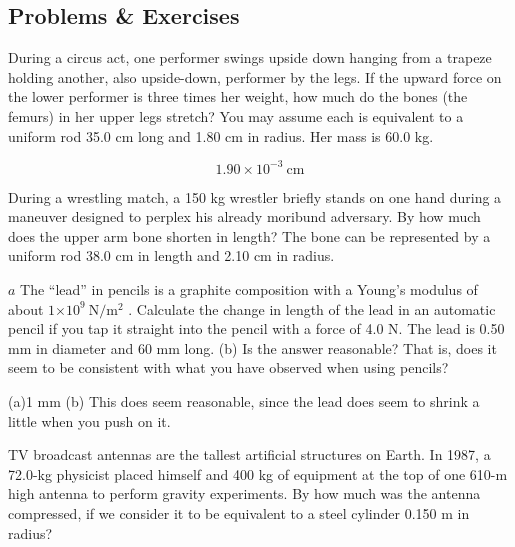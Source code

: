 \documentclass[
]{book}
\begin{document}
\hypertarget{fs-id1165298820012}{}
\hypertarget{problems-exercises-11}{%
\subsection{Problems \& Exercises}\label{problems-exercises-11}}

\hypertarget{fs-id1165298795593}{}
\leavevmode{}%
During a circus act, one performer swings upside down hanging from a
trapeze holding another, also upside-down, performer by the legs. If the
upward force on the lower performer is three times her weight, how much
do the bones (the femurs) in her upper legs stretch? You may assume each
is equivalent to a uniform rod 35.0 cm long and 1.80 cm in radius. Her
mass is 60.0 kg.

\hypertarget{fs-id1165298841662}{}
\leavevmode{}%
\[{1\text{.}{\text{90} \times \text{10}^{- 3}}\ \text{cm}}{}\]

\hypertarget{fs-id1165298595705}{}
\leavevmode{}%
During a wrestling match, a 150 kg wrestler briefly stands on one hand
during a maneuver designed to perplex his already moribund adversary. By
how much does the upper arm bone shorten in length? The bone can be
represented by a uniform rod 38.0 cm in length and 2.10 cm in radius.

\hypertarget{fs-id1165298778825}{}
\leavevmode{}%
\(a\) The ``lead'' in pencils is a graphite composition with a Young's
modulus of about \({1{\times \text{10}^{9}}\ {\text{N}/\text{m}^{2}}}{}\)
. Calculate the change in length of the lead in an automatic pencil if
you tap it straight into the pencil with a force of 4.0 N. The lead is
0.50 mm in diameter and 60 mm long. (b) Is the answer reasonable? That
is, does it seem to be consistent with what you have observed when using
pencils?

\leavevmode{}%
(a)1 mm {\hfill\break
}(b) This does seem reasonable, since the lead does
seem to shrink a little when you push on it.

\hypertarget{fs-id1165298941254}{}
\leavevmode{}%
TV broadcast antennas are the tallest artificial structures on Earth. In
1987, a 72.0-kg physicist placed himself and 400 kg of equipment at the
top of one 610-m high antenna to perform gravity experiments. By how
much was the antenna compressed, if we consider it to be equivalent to a
steel cylinder 0.150 m in radius?
\end{document}
